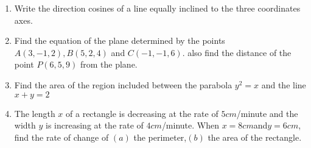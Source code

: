 \begin{enumerate}
\item 
Write the direction cosines of a line equally inclined to the three coordinates axes. 
\item 
Find the equation of the plane determined by the points $A(3, -1, 2), B(5, 2, 4)$ and $C(-1, -1, 6)$. also find the distance of the point $P(6, 5, 9)$ from the plane.
\item 
Find the area of the region included between the parabola ${y}^ {2} = x$ and the line $x + y = 2$
\item 
The length $x$ of a rectangle is decreasing at the rate of $5 cm$/minute and the width $y$ is increasing at the rate of $4 cm$/minute. When $x = 8 cm $and$ y = 6 cm$, find the rate of change of $(a)$ the perimeter,$ (b)$ the area of the rectangle.
\end{enumerate}


